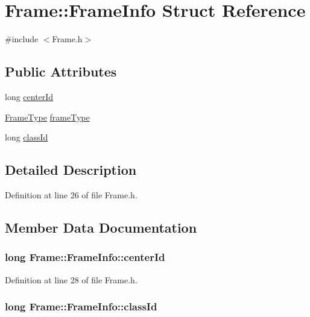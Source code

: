 \hypertarget{struct_frame_1_1_frame_info}{\section{Frame\+:\+:Frame\+Info Struct Reference}
\label{struct_frame_1_1_frame_info}
}


{\ttfamily \#include $<$Frame.\+h$>$}

\subsection*{Public Attributes}
\begin{DoxyCompactItemize}
\item 
long \hyperlink{struct_frame_1_1_frame_info_a13df02e5be92dc224b0ed75c2e339fc5}{center\+Id}
\item 
\hyperlink{class_frame_ad2f22450377db20233914c9ec0a21df4}{Frame\+Type} \hyperlink{struct_frame_1_1_frame_info_a26a5b5ce9d01a6029fbd2aaf6c77e574}{frame\+Type}
\item 
long \hyperlink{struct_frame_1_1_frame_info_a26545f9bb7266068c37985694b990192}{class\+Id}
\end{DoxyCompactItemize}


\subsection{Detailed Description}


Definition at line 26 of file Frame.\+h.



\subsection{Member Data Documentation}
\hypertarget{struct_frame_1_1_frame_info_a13df02e5be92dc224b0ed75c2e339fc5}{
\subsubsection[{center\+Id}]{\setlength{\rightskip}{0pt plus 5cm}long Frame\+::\+Frame\+Info\+::center\+Id}}\label{struct_frame_1_1_frame_info_a13df02e5be92dc224b0ed75c2e339fc5}


Definition at line 28 of file Frame.\+h.

\hypertarget{struct_frame_1_1_frame_info_a26545f9bb7266068c37985694b990192}{
\subsubsection[{class\+Id}]{\setlength{\rightskip}{0pt plus 5cm}long Frame\+::\+Frame\+Info\+::class\+Id}}\label{struct_frame_1_1_frame_info_a26545f9bb7266068c37985694b990192}


